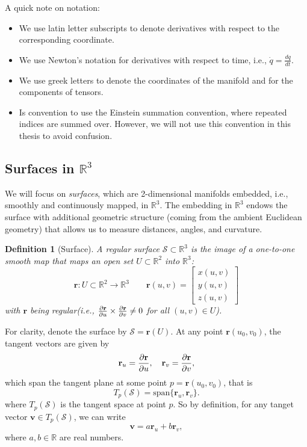 \documentclass[12pt]{article}
\newcommand{\R}{\mathbb{R}}
\newtheorem{definition}{Definition}[section]
\begin{document}
A quick note on notation: 
\begin{itemize}
	\item We use latin letter subscripts to denote derivatives with respect to the corresponding coordinate.
	\item We use Newton's notation for derivatives with respect to time, i.e., $\dot{q} = \frac{dq}{dt}$.
	\item We use greek letters to denote the coordinates of the manifold and for the components of tensors.
	\item Is convention to use the Einstein summation convention, where repeated indices are summed over. However, we will not use this convention in this thesis to avoid confusion.
\end{itemize}

\subsection{Surfaces in \texorpdfstring{$\mathbb{R}^3$}{R3}}\label{sec:surface-def}

We will focus on \emph{surfaces}, which are 2-dimensional manifolds embedded, i.e., smoothly and continuously mapped, in $\mathbb{R}^3$.
The embedding in $\mathbb{R}^3$ endows the surface with additional geometric structure (coming from the ambient Euclidean geometry) that allows us to measure distances, angles, and curvature.

\begin{definition}[Surface]\label{def:surface}
	A regular surface $\mathcal{S}\subset\R^3$ is the image of a one-to-one smooth map that maps an open set $U\subset\R^{2}$ into $\R^3$:
	\begin{equation}\label{eq:surface-param}		
		\mathbf{r}: U\subset\R^{2}\to\R^3 \qquad \mathbf{r}(u,v) = \begin{bmatrix}
			x(u,v)\\[1ex]
			y(u,v)\\[1ex]
			z(u,v)
		\end{bmatrix}
	\end{equation}
	with $\mathbf{r}$ being regular(i.e., $\pdv{\mathbf{r}}{u} \times \pdv{\mathbf{r}}{v} \neq 0$ for all $(u,v)\in U$).
\end{definition}

For clarity, denote the surface by $\mathcal{S}=\mathbf{r}(U)$. At any point $\mathbf{r}(u_0,v_0)$, the tangent vectors are given by
\[
\mathbf{r}_u = \pdv{\mathbf{r}}{u}, \quad \mathbf{r}_v = \pdv{\mathbf{r}}{v},
\]
which span the tangent plane at some point $p = \mathbf{r}(u_0,v_0)$, that is 
\[
T_{p}(\mathcal{S}) = \text{span}\{\mathbf{r}_u,\mathbf{r}_v\}.
\]
where $T_{p}(\mathcal{S})$ is the tangent space at point $p$.
So by definition, for any tanget vector $\mathbf{v}\in T_{p}(\mathcal{S})$, we can write
\[
\mathbf{v} = a\mathbf{r}_u + b\mathbf{r}_v,
\]
where $a,b\in\R$ are real numbers.
\end{document}
